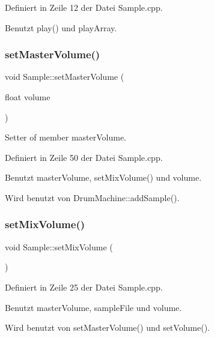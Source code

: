Definiert in Zeile 12 der Datei Sample.\+cpp.



Benutzt play() und play\+Array.

\mbox{\label{class_sample_af8ad49b65a536c535393e3968516b871}} 
\subsubsection{\texorpdfstring{set\+Master\+Volume()}{setMasterVolume()}}
{\footnotesize\ttfamily void Sample\+::set\+Master\+Volume (\begin{DoxyParamCaption}\item[{float}]{volume }\end{DoxyParamCaption})}



Setter of member master\+Volume. 



Definiert in Zeile 50 der Datei Sample.\+cpp.



Benutzt master\+Volume, set\+Mix\+Volume() und volume.



Wird benutzt von Drum\+Machine\+::add\+Sample().

\mbox{\label{class_sample_a6d13988721d2190947f65969d4737a48}} 
\subsubsection{\texorpdfstring{set\+Mix\+Volume()}{setMixVolume()}}
{\footnotesize\ttfamily void Sample\+::set\+Mix\+Volume (\begin{DoxyParamCaption}{ }\end{DoxyParamCaption})\hspace{0.3cm}{\ttfamily [private]}}



Definiert in Zeile 25 der Datei Sample.\+cpp.



Benutzt master\+Volume, sample\+File und volume.



Wird benutzt von set\+Master\+Volume() und set\+Volume().

